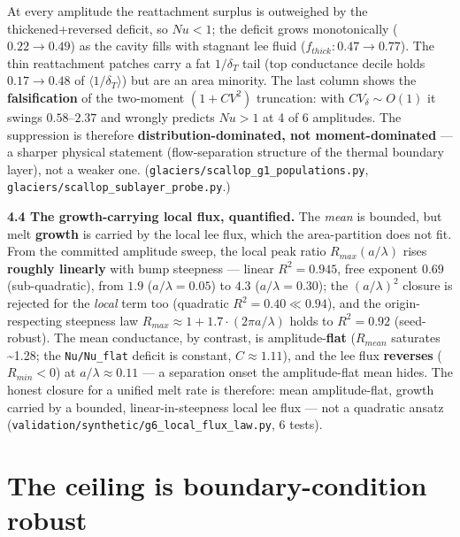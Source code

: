\documentclass[tc, manuscript]{copernicus}
\begin{document}
At every amplitude the reattachment surplus is outweighed by the thickened+reversed deficit, so $Nu<1$; the deficit grows monotonically ($0.22\to 0.49$) as the cavity fills with stagnant lee fluid ($f_{thick}: 0.47\to 0.77$). The thin reattachment patches carry a fat $1/\delta _{T}$ tail (top conductance decile holds $0.17\to 0.48$ of $\langle 1/\delta _{T}\rangle $) but are an area minority. The last column shows the \textbf{falsification} of the two-moment $(1+CV^{2})$ truncation: with $CV_\delta \sim O(1)$ it swings $0.58\mbox{--}2.37$ and wrongly predicts $Nu>1$ at 4 of 6 amplitudes. The suppression is therefore \textbf{distribution-dominated, not moment-dominated} — a sharper physical statement (flow-separation structure of the thermal boundary layer), not a weaker one. (\texttt{glaciers/\allowbreak{}scallop\_\allowbreak{}g1\_\allowbreak{}populations.\allowbreak{}py}, \texttt{glaciers/\allowbreak{}scallop\_\allowbreak{}sublayer\_\allowbreak{}probe.\allowbreak{}py}.)

\textbf{4.4 The growth-carrying local flux, quantified.} The \emph{mean} is bounded, but melt \textbf{growth} is carried by the local lee flux, which the area-partition does not fit. From the committed amplitude sweep, the local peak ratio $R_{max}(a/\lambda )$ rises \textbf{roughly linearly} with bump steepness — linear $R^{2}=0.945$, free exponent $0.69$ (sub-quadratic), from $1.9$ ($a/\lambda =0.05$) to $4.3$ ($a/\lambda =0.30$); the $(a/\lambda )^{2}$ closure is rejected for the \emph{local} term too (quadratic $R^{2}=0.40\ll 0.94$), and the origin-respecting steepness law $R_{max}\approx 1+1.7\cdot (2\pi  a/\lambda )$ holds to $R^{2}=0.92$ (seed-robust). The mean conductance, by contrast, is amplitude-\textbf{flat} ($R_{mean}$ saturates \textasciitilde{}1.28; the \texttt{Nu/\allowbreak{}Nu\_\allowbreak{}flat} deficit is constant, $C\approx 1.11$), and the lee flux \textbf{reverses} ($R_{min}<0$) at $a/\lambda \approx 0.11$ — a separation onset the amplitude-flat mean hides. The honest closure for a unified melt rate is therefore: mean amplitude-flat, growth carried by a bounded, linear-in-steepness local lee flux — not a quadratic ansatz (\texttt{validation/\allowbreak{}synthetic/\allowbreak{}g6\_\allowbreak{}local\_\allowbreak{}flux\_\allowbreak{}law.\allowbreak{}py}, 6 tests).

\section{The ceiling is boundary-condition robust}
\end{document}
